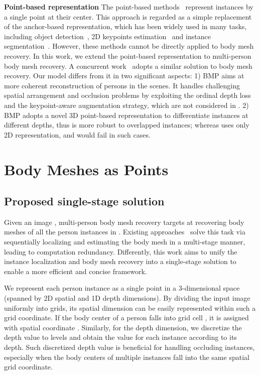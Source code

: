 \documentclass[final]{cvpr}
\newcommand{\myparagraph}[1]{{ \noindent \bf #1}}
\begin{document}
\myparagraph{Point-based representation}
The point-based methods~\cite{duan2019centernet,zhou2019objects,tian2019fcos} represent instances by a single point at their center. 
This approach is regarded as a simple replacement of the anchor-based representation, which has been widely used in many tasks, including object detection~\cite{duan2019centernet,zhou2019objects,tian2019fcos}, 2D keypoints estimation~\cite{nie2019spm} and instance segmentation~\cite{wang2019solo}.
However, these methods cannot be directly applied to body mesh recovery. 
In this work, we extend the point-based representation to multi-person body mesh recovery. 
A concurrent work~\cite{CenterHMR} adopts a similar solution to body mesh recovery. Our model differs from it in two significant aspects: 
1)  BMP aims at more coherent reconstruction of persons in the scenes. It handles challenging spatial arrangement and occlusion problems by exploiting the
ordinal depth loss and the keypoint-aware augmentation strategy, which are not considered in \cite{CenterHMR}. 2) BMP
adopts a novel 3D point-based representation to differentiate instances at different depths, thus is more robust to overlapped instances; whereas \cite{CenterHMR} uses only 2D representation, and would fail in such cases.



 
\section{Body Meshes as Points}

\subsection{Proposed single-stage solution} \label{sec:formulation}

Given an image , multi-person body mesh recovery targets at recovering body meshes of all the person instances in . 
Existing approaches~\cite{zanfir2018deep,zanfir2018monocular,jiang2020coherent} solve this task via sequentially localizing and estimating the body mesh in a multi-stage manner, leading to computation redundancy. 
Differently, this work aims to unify the instance localization and body mesh recovery into a single-stage solution to enable a more efficient and concise framework. 


We represent each person instance as a single point  in a 3-dimensional space (spanned by 2D spatial and 1D depth dimensions).
By dividing the input image uniformly into  grids, its spatial dimension can be easily represented within such a grid coordinate.  
If the body center of a person falls into grid cell , it is assigned with spatial coordinate . 
Similarly, for the depth dimension, we discretize the depth value to  levels and obtain the  value for each instance according to its depth. 
Such discretized depth value is beneficial for handling occluding instances, especially when the body centers of multiple instances fall into the same spatial grid coordinate. 
\end{document}
